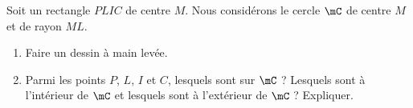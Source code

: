 
\begin{exercice}\label{exo2smath-0307}

    Soit un rectangle \( PLIC\) de centre \( M\). Nous considérons le cercle \( \mC\) de centre \( M\) et de rayon \( ML\).
    \begin{enumerate}
        \item
            Faire un dessin à main levée.
        \item
            Parmi les points \( P\), \( L\), \( I\) et \( C\), lesquels sont sur \( \mC\) ? Lesquels sont à l'intérieur de \( \mC\) et lesquels sont à l'extérieur de \( \mC\) ? Expliquer.
    \end{enumerate}

\end{exercice}
